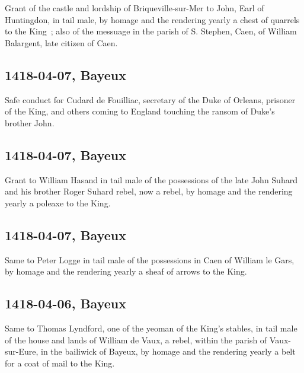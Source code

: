 \documentclass[a4paper,12pt,twoside]{book}
\begin{document}
                
                  Grant of the castle and lordship of Briqueville-sur-Mer to John, Earl of Huntingdon, in tail male, by homage and the rendering yearly a chest of quarrels to the King ; also of the messuage in the parish of S. Stephen, Caen, of William Balargent, late citizen of Caen.
               
                
                \subsection{1418-04-07, Bayeux}
                
                
                     Safe conduct for Cudard de Fouilliac, secretary of the Duke of Orleans, prisoner of the King, and others coming to England touching the ransom of Duke's brother John.
                  
                
                \subsection{1418-04-07, Bayeux}
                
                
                     Grant to William Hasand in tail male of the possessions of the late John Suhard and his brother Roger Suhard rebel, now a rebel, by homage and the rendering yearly a poleaxe to the King.
                  
                
                \subsection{1418-04-07, Bayeux}
                
                
                     Same to Peter Logge in tail male of the possessions in Caen of William le Gars, by homage and the rendering yearly a sheaf of arrows to the King.
                  
                
                \subsection{1418-04-06, Bayeux}
                
                
                     Same to Thomas Lyndford, one of the yeoman of the King's stables, in tail male of the house and lands of William de Vaux, a rebel, within the parish of Vaux-sur-Eure, in the bailiwick of Bayeux, by homage and the rendering yearly a belt for a coat of mail to the King.
                  
\end{document}
